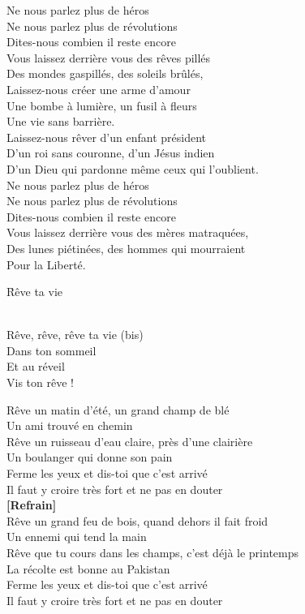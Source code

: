 \documentclass{novel}
\begin{document}
Ne nous parlez plus de héros \\
Ne nous parlez plus de révolutions \\
Dites-nous combien il reste encore \\
Vous laissez derrière vous des rêves pillés \\
Des mondes gaspillés, des soleils brûlés, \\
Laissez-nous créer une arme d’amour \\
Une bombe à lumière, un fusil à fleurs \\
Une vie sans barrière. \\
Laissez-nous rêver d’un enfant président \\
D’un roi sans couronne, d’un Jésus indien \\
D’un Dieu qui pardonne même ceux qui l’oublient. \\
Ne nous parlez plus de héros \\
Ne nous parlez plus de révolutions \\
Dites-nous combien il reste encore \\
Vous laissez derrière vous des mères matraquées, \\
Des lunes piétinées, des hommes qui mourraient \\
Pour la Liberté.

\newpage
\normalsize

\h*{Rêve ta vie}

\begin{bfseries}
[Refrain:]\\
Rêve, rêve, rêve ta vie (bis) \\
Dans ton sommeil \\
Et au réveil \\
Vis ton rêve ! \\
\end{bfseries}

Rêve un matin d'été, un grand champ de blé \\
Un ami trouvé en chemin \\
Rêve un ruisseau d'eau claire, près d'une clairière \\
Un boulanger qui donne son pain \\
Ferme les yeux et dis-toi que c'est arrivé \\
Il faut y croire très fort et ne pas en douter \\

\textbf{[Refrain]} \\

Rêve un grand feu de bois, quand dehors il fait froid \\
Un ennemi qui tend la main \\
Rêve que tu cours dans les champs, c'est déjà le printemps \\
La récolte est bonne au Pakistan \\
Ferme les yeux et dis-toi que c'est arrivé \\
Il faut y croire très fort et ne pas en douter
\end{document}

